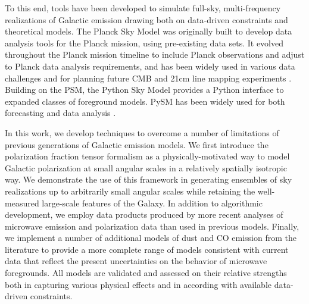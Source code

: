 \documentclass[twocolumn]{aastex631}
\newcommand{\giuse}[1]{\textcolor{orange}{(GP: #1)}}
\begin{document}
To this end, tools have been developed to simulate full-sky, multi-frequency realizations of Galactic emission drawing both on data-driven constraints and theoretical models. The Planck Sky Model \citep[PSM;][]{delabrouille2012} was originally built to develop data analysis tools for the Planck mission, using pre-existing data sets. It evolved throughout the Planck mission timeline to include Planck observations and adjust to Planck data analysis requirements, and has been widely used in various data challenges and for planning future CMB and 21cm line mapping experiments \citep[e.g.,][]{Remazeilles:2018, Fornazier:2022, Ghosh:2022}. Building on the PSM, the Python Sky Model \citep[PySM;][]{Thorne:2017} provides a Python interface to expanded classes of foreground models. PySM has been widely used for both forecasting \citep[e.g.,][]{Abazajian:2022, Hensley:2022, CCAT-PrimeCollaboration:2023, Wolz:2024} and data analysis \citep{Vacher:2023}.

In this work, we develop techniques to overcome a number of limitations of previous generations of Galactic emission models. We first introduce the polarization fraction tensor formalism as a physically-motivated way to model Galactic polarization at small angular scales in a relatively spatially isotropic way. We demonstrate the use of this framework in generating ensembles of sky realizations up to arbitrarily small angular scales while retaining the well-measured large-scale features of the Galaxy. In addition to algorithmic development, we employ data products produced by more recent analyses of microwave emission and polarization data than used in previous models. Finally, we implement a number of additional models of dust and CO emission from the literature to provide a more complete range of models consistent with current data that reflect the present uncertainties on the behavior of microwave foregrounds. All models are validated and assessed on their relative strengths both in capturing various physical effects and in according with available data-driven constraints.


\end{document}
